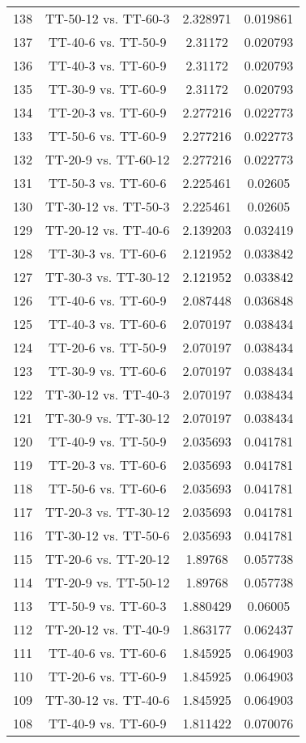 \documentclass[a4paper,10pt]{article}
\begin{document}
\begin{landscape}
\begin{table}[!htp]
\begin{tabular}{cccc}
138&TT-50-12 vs. TT-60-3&2.328971&0.019861\\
137&TT-40-6 vs. TT-50-9&2.31172&0.020793\\
136&TT-40-3 vs. TT-60-9&2.31172&0.020793\\
135&TT-30-9 vs. TT-60-9&2.31172&0.020793\\
134&TT-20-3 vs. TT-60-9&2.277216&0.022773\\
133&TT-50-6 vs. TT-60-9&2.277216&0.022773\\
132&TT-20-9 vs. TT-60-12&2.277216&0.022773\\
131&TT-50-3 vs. TT-60-6&2.225461&0.02605\\
130&TT-30-12 vs. TT-50-3&2.225461&0.02605\\
129&TT-20-12 vs. TT-40-6&2.139203&0.032419\\
128&TT-30-3 vs. TT-60-6&2.121952&0.033842\\
127&TT-30-3 vs. TT-30-12&2.121952&0.033842\\
126&TT-40-6 vs. TT-60-9&2.087448&0.036848\\
125&TT-40-3 vs. TT-60-6&2.070197&0.038434\\
124&TT-20-6 vs. TT-50-9&2.070197&0.038434\\
123&TT-30-9 vs. TT-60-6&2.070197&0.038434\\
122&TT-30-12 vs. TT-40-3&2.070197&0.038434\\
121&TT-30-9 vs. TT-30-12&2.070197&0.038434\\
120&TT-40-9 vs. TT-50-9&2.035693&0.041781\\
119&TT-20-3 vs. TT-60-6&2.035693&0.041781\\
118&TT-50-6 vs. TT-60-6&2.035693&0.041781\\
117&TT-20-3 vs. TT-30-12&2.035693&0.041781\\
116&TT-30-12 vs. TT-50-6&2.035693&0.041781\\
115&TT-20-6 vs. TT-20-12&1.89768&0.057738\\
114&TT-20-9 vs. TT-50-12&1.89768&0.057738\\
113&TT-50-9 vs. TT-60-3&1.880429&0.06005\\
112&TT-20-12 vs. TT-40-9&1.863177&0.062437\\
111&TT-40-6 vs. TT-60-6&1.845925&0.064903\\
110&TT-20-6 vs. TT-60-9&1.845925&0.064903\\
109&TT-30-12 vs. TT-40-6&1.845925&0.064903\\
108&TT-40-9 vs. TT-60-9&1.811422&0.070076\\

\end{tabular}
\end{table}
\end{landscape}
\end{document}
